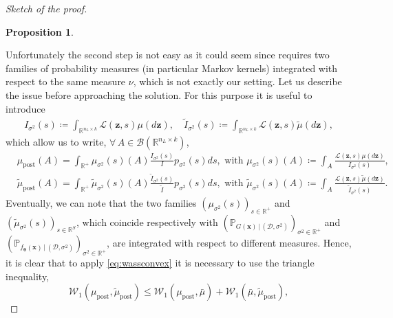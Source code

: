 \documentclass[a4paper, 11pt, reqno]{amsart}
\theoremstyle{plain}
\newtheorem{proposition}[theorem]{Proposition}
\theoremstyle{remark}
\theoremstyle{definition}
\newcommand{\given}{\, | \,}
\newcommand{\wass}[3][2]{\mathcal{W}_{#1}\left(#2, #3\right)}
\newcommand{\real}{\mathbb{R}}
\newcommand{\borel}[1]{\mathcal{B}\left(#1\right)}
\let\oldforall\forall
\renewcommand{\forall}{\oldforall\,}
\newcommand{\train}{\mathcal{D}}
\begin{document}
\begin{proof}[Sketch of the proof]
\begin{enumerate}
\begin{proposition}
        \end{proposition}
    \end{enumerate}
    Unfortunately the second step is not easy as it could seem since  requires two families of probability measures (in particular Markov kernels) integrated with respect to the same measure $\nu$, which is not exactly our setting. 
    Let us describe the issue before approaching the solution. For this purpose it is useful to introduce
    \begin{equation*}
        \begin{aligned}
            \mathit{I}_{\sigma^2}(s) \coloneqq \int_{\real^{n_L \times k}} \mathcal{L}(\bm{z}, s) \mu(d\bm{z}), \quad \widetilde{\mathit{I}}_{\sigma^2}(s) \coloneqq \int_{\real^{n_L \times k}} \mathcal{L}(\bm{z}, s) \widetilde{\mu}(d\bm{z}),
        \end{aligned}
    \end{equation*}
    which allow us to write, $\forall A \in \borel{\real^{n_L \times k}}$,
    \begin{equation} \label{eq:mupost}
        \begin{aligned}
            & \mu_{\mathrm{post}}(A) = \int_{\real^+} \mu_{\sigma^2}(s)(A) \frac{\mathit{I}_{\sigma^2}(s)}{\mathit{I}} p_{\sigma^2}(s) ds, \text{ with } \mu_{\sigma^2}(s)(A) \coloneqq \int_A \frac{\mathcal{L}(\bm{z}, s) \mu(d\bm{z})}{\mathit{I}_{\sigma^2}(s)}, \\
            & \widetilde{\mu}_{\mathrm{post}}(A) = \int_{\real^+} \widetilde{\mu}_{\sigma^2}(s)(A) \frac{\widetilde{\mathit{I}}_{\sigma^2}(s)}{\widetilde{\mathit{I}}} p_{\sigma^2}(s) ds, \text{ with } \widetilde{\mu}_{\sigma^2}(s)(A) \coloneqq \int_A \frac{\mathcal{L}(\bm{z}, s) \widetilde{\mu}(d\bm{z})}{\widetilde{\mathit{I}}_{\sigma^2}(s)}.
        \end{aligned}
    \end{equation}
    Eventually, we can note that the two families $(\mu_{\sigma^2}(s))_{s \in \real^+}$ and $(\widetilde{\mu}_{\sigma^2}(s))_{s \in \real^S}$, which coincide respectively with $\left(\mathbb{P}_{G(\bm{x}) \given (\train, \sigma^2)}\right)_{\sigma^2 \in \real^+}$ and $\left(\mathbb{P}_{f_{\bm{\theta}}(\bm{x}) \given (\train, \sigma^2)}\right)_{\sigma^2 \in \real^+}$, are integrated with respect to different measures.
    Hence, it is clear that to apply \cref{eq:wassconvex} it is necessary to use the triangle inequality,
    \begin{equation} \label{eq:trianstep}
        \wass[1]{\mu_{\mathrm{post}}}{\widetilde{\mu}_{\mathrm{post}}} \leq \wass[1]{\mu_{\mathrm{post}}}{\bar{\mu}} + \wass[1]{\bar{\mu}}{\widetilde{\mu}_{\mathrm{post}}},

\end{equation}
\end{proof}
\end{document}
